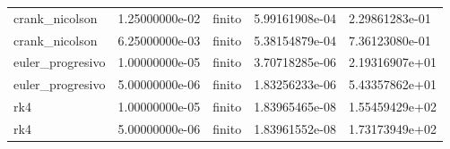 \begin{table}[htbp]
\begin{tabular}{lllll}
crank\_nicolson & 1.25000000e-02 & finito & 5.99161908e-04 & 2.29861283e-01 \\
crank\_nicolson & 6.25000000e-03 & finito & 5.38154879e-04 & 7.36123080e-01 \\
euler\_progresivo & 1.00000000e-05 & finito & 3.70718285e-06 & 2.19316907e+01 \\
euler\_progresivo & 5.00000000e-06 & finito & 1.83256233e-06 & 5.43357862e+01 \\
rk4 & 1.00000000e-05 & finito & 1.83965465e-08 & 1.55459429e+02 \\
rk4 & 5.00000000e-06 & finito & 1.83961552e-08 & 1.73173949e+02 \\
\hline
\end{tabular}
\par\smallskip
\footnotesize{}
\end{table}

